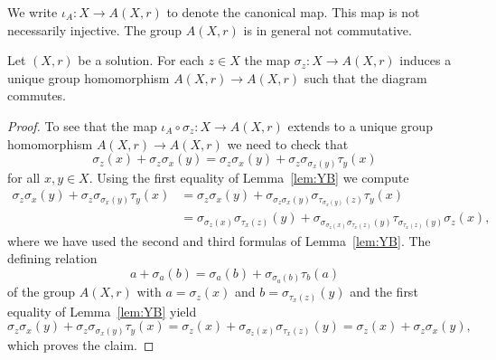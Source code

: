 We write $\iota_A\colon X\to A(X,r)$ to denote the canonical map. This map is not necessarily injective.
The group $A(X,r)$ is in general not commutative. 


\begin{lemma}
\label{lem:sigma}
Let $(X,r)$ be a solution. 
For each $z\in X$ the 
map $\sigma_z\colon X\to A(X,r)$ induces a unique group homomorphism $A(X,r)\to A(X,r)$ such that
the diagram
commutes.
\end{lemma}

\begin{proof}
To see that the map $\iota_A\circ\sigma_z\colon X\to A(X,r)$ extends to a unique group homomorphism
$A(X,r)\to A(X,r)$ we need to check that 
\[
\sigma_z(x)+\sigma_z\sigma_x(y)=\sigma_z\sigma_x(y)+\sigma_z\sigma_{\sigma_x(y)}\tau_y(x)
\]
for all $x,y\in X$. Using the first equality of Lemma~\ref{lem:YB} we compute
\begin{align*}
    \sigma_z\sigma_x(y)+\sigma_z\sigma_{\sigma_x(y)}\tau_y(x) &= 
    \sigma_z\sigma_x(y)+\sigma_{\sigma_z\sigma_x(y)}\sigma_{\tau_{\sigma_x(y)}(z)}\tau_y(x)\\
    &=\sigma_{\sigma_z(x)}\sigma_{\tau_x(z)}(y)+\sigma_{\sigma_{\sigma_z(x)}\sigma_{\tau_x(z)}(y)}\tau_{\sigma_{\tau_x(z)}(y)}\sigma_z(x),
\end{align*}
where we have used the second and third formulas of Lemma~\ref{lem:YB}. The defining relation 
\[
a+\sigma_a(b)=\sigma_a(b)+\sigma_{\sigma_a(b)}\tau_b(a)
\]
of the group $A(X,r)$ with $a=\sigma_z(x)$ and $b=\sigma_{\tau_x(z)}(y)$ and the first equality of Lemma~\ref{lem:YB} yield
\[
\sigma_z\sigma_x(y)+\sigma_z\sigma_{\sigma_x(y)}\tau_y(x)
=\sigma_z(x)+\sigma_{\sigma_z(x)}\sigma_{\tau_x(z)}(y)
=\sigma_z(x)+\sigma_z\sigma_x(y),
\]
which proves the claim. 
\end{proof}

